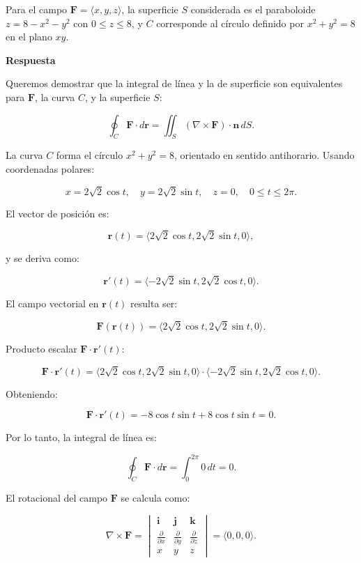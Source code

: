 \documentclass{report}
\begin{document}
Para el campo \(\mathbf{F}=\langle x, y, z\rangle\), la superficie \( S \) considerada es el paraboloide \( z=8-x^2-y^2 \) con \( 0 \leq z \leq 8 \), y \( C \) corresponde al círculo definido por \( x^2+y^2=8 \) en el plano \( xy \).

\textbf{Respuesta}

Queremos demostrar que la integral de línea y la de superficie son equivalentes para \(\mathbf{F}\), la curva \( C \), y la superficie \( S \):

\[
\oint_C \mathbf{F} \cdot d\mathbf{r} = \iint_S (\nabla \times \mathbf{F}) \cdot \mathbf{n} \, dS.
\]



La curva \( C \) forma el círculo \( x^2 + y^2 = 8 \), orientado en sentido antihorario. Usando coordenadas polares:

\[
x = 2\sqrt{2} \cos t, \quad y = 2\sqrt{2} \sin t, \quad z = 0, \quad 0 \leq t \leq 2\pi.
\]

El vector de posición es:

\[
\mathbf{r}(t) = \langle 2\sqrt{2} \cos t, 2\sqrt{2} \sin t, 0 \rangle,
\]

y se deriva como:

\[
\mathbf{r}'(t) = \langle -2\sqrt{2} \sin t, 2\sqrt{2} \cos t, 0 \rangle.
\]

El campo vectorial en \(\mathbf{r}(t)\) resulta ser:

\[
\mathbf{F}(\mathbf{r}(t)) = \langle 2\sqrt{2} \cos t, 2\sqrt{2} \sin t, 0 \rangle.
\]

Producto escalar \(\mathbf{F} \cdot \mathbf{r}'(t)\):

\[
\mathbf{F} \cdot \mathbf{r}'(t) = \langle 2\sqrt{2} \cos t, 2\sqrt{2} \sin t, 0 \rangle \cdot \langle -2\sqrt{2} \sin t, 2\sqrt{2} \cos t, 0 \rangle.
\]

Obteniendo:

\[
\mathbf{F} \cdot \mathbf{r}'(t) = -8 \cos t \sin t + 8 \cos t \sin t = 0.
\]

Por lo tanto, la integral de línea es:

\[
\oint_C \mathbf{F} \cdot d\mathbf{r} = \int_0^{2\pi} 0 \, dt = 0.
\]



El rotacional del campo \(\mathbf{F}\) se calcula como:

\[
\nabla \times \mathbf{F} = \begin{vmatrix}
\mathbf{i} & \mathbf{j} & \mathbf{k} \\
\frac{\partial}{\partial x} & \frac{\partial}{\partial y} & \frac{\partial}{\partial z} \\
x & y & z
\end{vmatrix} = \langle 0, 0, 0 \rangle.
\]
\end{document}

